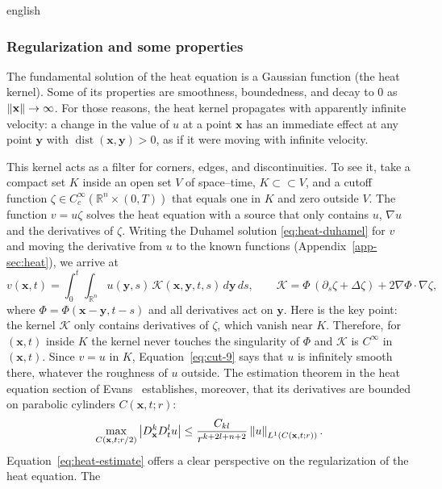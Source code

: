\documentclass[0000.tex]{subfiles}
\begin{document}
\begin{hyphenrules}{english}
\subsubsection{Regularization and some properties}
The fundamental solution of the heat equation is a Gaussian function (the heat kernel). Some of its
properties are smoothness, boundedness, and decay to $0$ as $\left\lVert \mathbf{x} \right\rVert\to\infty$. For those reasons,
the heat kernel propagates with apparently infinite velocity: a change in the value of $u$ at a point
$\mathbf{x}$ has an immediate effect at any point $\mathbf{y}$ with $\operatorname{dist}(\mathbf{x},\mathbf{y})>0$, as if it were
moving with infinite velocity.

This kernel acts as a filter for corners, edges, and discontinuities. To see it, take a compact set $K$
inside an open set $V$ of space--time, $K\subset\subset V$, and a cutoff function
$\zeta\in C_c^\infty(\mathbb{R}^n\times(0,T))$ that equals one in $K$ and zero outside $V$. The function
$v=u\zeta$ solves the heat equation with a source that only contains $u$, $\nabla u$ and the derivatives
of $\zeta$. Writing the Duhamel solution \eqref{eq:heat-duhamel} for $v$ and moving the derivative from $u$
to the known functions (Appendix~\ref{app-sec:heat}), we arrive at
\begin{equation}
  v(\mathbf{x},t)=\int_0^t\!\!\int_{\mathbb{R}^n}u(\mathbf{y},s)\,\mathcal{K}(\mathbf{x},\mathbf{y},t,s)\,d\mathbf{y}\,d s,
  \qquad\mathcal{K}=\Phi\,(\partial_s\zeta+\Delta\zeta)+2\nabla\Phi\cdot\nabla\zeta,
  \label{eq:cut-9}
\end{equation}
where $\Phi=\Phi(\mathbf{x}-\mathbf{y},t-s)$ and all derivatives act on $\mathbf{y}$. Here is the key point: the kernel $\mathcal{K}$ only contains derivatives of $\zeta$, which vanish
near $K$. Therefore, for $(\mathbf{x},t)$ inside $K$ the kernel never touches the singularity of $\Phi$ and
$\mathcal{K}$ is $C^\infty$ in $(\mathbf{x},t)$. Since $v=u$ in $K$, Equation~\eqref{eq:cut-9} says that $u$ is
infinitely smooth there, whatever the roughness of $u$ outside. The estimation theorem in the heat
equation section of Evans~\cite{evans2010} establishes, moreover, that its derivatives are bounded on
parabolic cylinders $C(\mathbf{x},t;r)$:
\begin{equation}
  \max_{C(\mathbf{x},t;r/2)}\left\lvert D_{\mathbf{x}}^{k}D_t^{l}u \right\rvert\le\frac{C_{kl}}{r^{k+2l+n+2}}\left\lVert u \right\rVert_{L^1(C(\mathbf{x},t;r))}.
  \label{eq:heat-estimate}
\end{equation}
Equation~\eqref{eq:heat-estimate} offers a clear perspective on the regularization of the heat equation. The

\end{hyphenrules}
\end{document}
